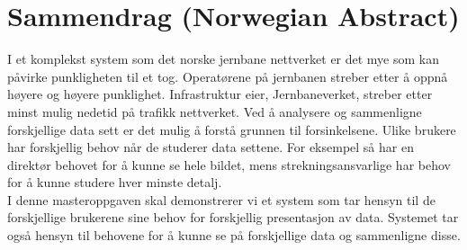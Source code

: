 \section*{Sammendrag (Norwegian Abstract)}

I et komplekst system som det norske jernbane nettverket er det mye som kan
påvirke punkligheten til et tog. Operatørene på jernbanen streber etter å oppnå
høyere og høyere punklighet. Infrastruktur eier, Jernbaneverket,  streber etter
minst mulig nedetid på trafikk nettverket.
Ved å analysere og sammenligne forskjellige data sett er det mulig å forstå grunnen til forsinkelsene.
Ulike brukere har forskjellig behov når de studerer data settene. For eksempel
så har en direktør behovet for å kunne se hele bildet, mens
strekningsansvarlige har behov for å kunne studere hver minste detalj.\\

I denne masteroppgaven skal demonstrerer vi et system som tar hensyn til de
forskjellige brukerene sine behov for forskjellig presentasjon av data.
Systemet tar også hensyn til behovene for å kunne se på forskjellige data
og sammenligne disse.
	
\clearpage
